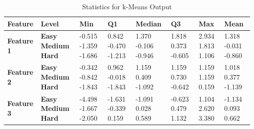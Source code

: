 \documentclass[12pt]{article}
\begin{document}
	\begin{center}
	\begin{table}[h]
		\begin{tabular}{ | m{2cm} | m{1.7cm} | m{1.3cm} | m{1.3cm} | m{1.5cm} | m{1.3cm} | m{1.3cm} | m{1.3cm} | }
		\hline
		\textbf{Feature} & \textbf{Level} & \textbf{Min} & \textbf{Q1} & \textbf{Median} & \textbf{Q3} & \textbf{Max} & \textbf{Mean}\\ 
		\hline
		\textbf{Feature 1} & \textbf{Easy Medium Hard} & -0.515 \hspace{5mm}-1.359 \hspace{5mm}-1.686 & 0.842 \hspace{5mm}-0.470 \hspace{5mm}-1.213 & 1.370  \hspace{5mm}-0.106 \hspace{5mm}-0.946 & 1.818 \hspace{5mm}0.373 \hspace{5mm}-0.605 & 2.934 \hspace{5mm}1.813 \hspace{5mm}1.106 & 1.318 \hspace{5mm}-0.031 \hspace{5mm}-0.860\\
		\hline
		\textbf{Feature 2} & \textbf{Easy Medium Hard} & -0.342 \hspace{5mm}-0.842 \hspace{5mm}-1.843 & 0.962 \hspace{5mm}-0.018 \hspace{5mm}-1.843 & 1.159  \hspace{5mm}0.409 \hspace{5mm}-1.092 & 1.159 \hspace{5mm}0.730 \hspace{5mm}-0.642 & 1.159 \hspace{5mm}1.159 \hspace{5mm}0.159 & 1.018 \hspace{5mm}0.377 \hspace{5mm}-1.139\\
		\hline
		\textbf{Feature 3} & \textbf{Easy Medium Hard} & -4.498 \hspace{5mm}-1.667 \hspace{5mm}-2.050 & -1.631 \hspace{5mm}-0.339 \hspace{5mm}0.159 & -1.091  \hspace{5mm}0.028 \hspace{5mm}0.589 & -0.623 \hspace{5mm}0.479 \hspace{5mm}1.132 & 1.104 \hspace{5mm}2.620 \hspace{5mm}3.380 & -1.134 \hspace{5mm}0.093 \hspace{5mm}0.662\\
		\hline
		\end{tabular}
		\caption{Statistics for k-Means Output}
	\end{table}
	\end{center}
	
\end{document}
